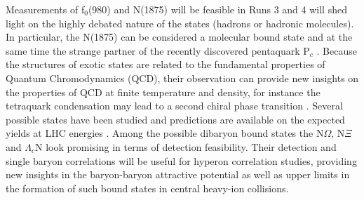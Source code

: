 Measurements of f$_{0}$(980) and N(1875) will be feasible in Runs 3 and 4 will shed light on the highly debated nature of the states (hadrons or hadronic molecules). In particular, the N(1875) can be considered a molecular bound state and at the same time the strange partner of the recently discovered pentaquark P$_{c}$ \cite{He:2017PcPartner}. 
Because the structures of exotic states are related to the fundamental properties of Quantum Chromodynamics (QCD), their observation can provide new insights on the properties of QCD at finite temperature and density, for instance the tetraquark condensation may lead to a second chiral phase transition \cite{Cho:2017dcy}.
Several possible states have been studied and predictions are available on the expected yields at LHC energies \cite{Cho:2017dcy}. Among the possible dibaryon bound states the N$\Omega$, N$\Xi$ and $\Lambda_c$N look promising in terms of detection feasibility. Their detection and single baryon correlations will be useful for hyperon correlation studies,  providing new insights in the baryon-baryon attractive potential as well as upper limits in the formation of such bound states in central heavy-ion collisions.